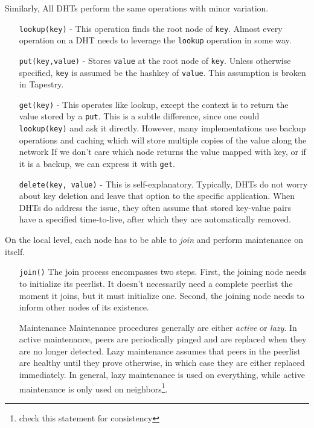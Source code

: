 \documentclass[10pt,letterpaper,twoside]{report}
\begin{document}
Similarly, All DHTs perform the same operations with minor variation.
\begin{enumerate}
	\item[\texttt{lookup(key)}] - This operation finds the root node of \texttt{key}.
	Almost every operation on a DHT needs to leverage the \texttt{lookup} operation in some way.
	\item[\texttt{put(key,value)}] - Stores \texttt{value} at the root node of \texttt{key}.
	Unless otherwise specified, \texttt{key} is assumed be the hashkey of \texttt{value}.
	This assumption is broken in Tapestry.
	\item[\texttt{get(key)}] - This operates like lookup, except the context is to return the value stored by a \texttt{put}.
	This is a subtle difference, since one could \texttt{lookup(key)} and ask it directly.
	However, many implementations use backup operations and caching which will store multiple copies of the value along the network
	If we don't care which node returns the value mapped with key, or if it is a backup,  we can express it with \texttt{get}.
	\item[\texttt{delete(key, value)}] - This is self-explanatory.  Typically, DHTs do not worry about key deletion and leave that option to the specific application.
    When DHTs do address the issue, they often assume that stored key-value pairs have a specified time-to-live, after which they are automatically removed.
\end{enumerate}

On the local level, each node has to be able to \textit{join }and perform maintenance on itself.
\begin{enumerate}
	\item[\texttt{join()}]  The join process encompasses two steps.
    First, the joining node needs to initialize its peerlist. 
    It doesn't necessarily need a complete peerlist the moment it joins, but it must initialize one. 
    Second, the joining node needs to inform other nodes of its existence.
    \item[Maintenance]  Maintenance procedures generally are either \textit{active} or \textit{lazy}.
    In active maintenance, peers are periodically pinged and are replaced when they are no longer detected.
    Lazy maintenance assumes that peers in the peerlist are healthy until they prove otherwise, in which case they are either replaced immediately.
    In general, lazy maintenance is used on everything, while active maintenance is only used on neighbors\footnote{check this statement for consistency}.
    
\end{enumerate}
\end{document}
